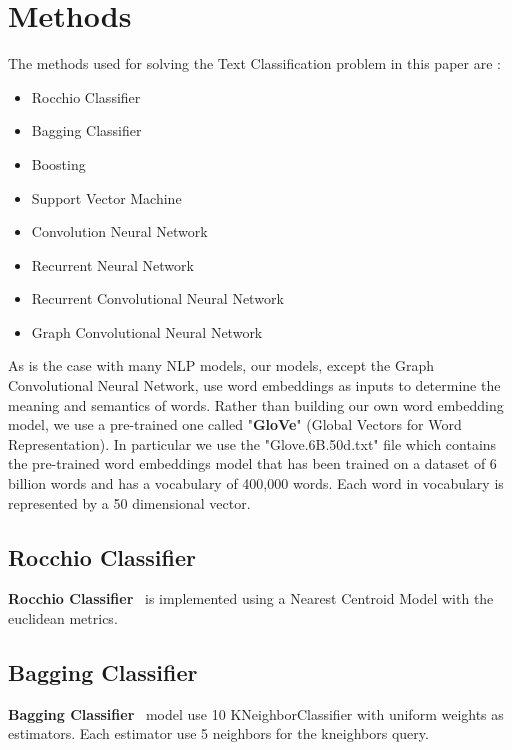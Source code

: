 \section{Methods}
The methods used for solving the Text Classification problem in this paper are :
\begin{itemize}
    \item Rocchio Classifier~\cite{paper-text-classification-algorithms}
    \item Bagging Classifier~\cite{paper-text-classification-algorithms}
    \item Boosting~\cite{paper-text-classification-algorithms}
    \item Support Vector Machine~\cite{paper-text-classification-algorithms}
    \item Convolution Neural Network~\cite{paper-text-classification-algorithms}
    \item Recurrent Neural Network~\cite{paper-text-classification-algorithms}
    \item Recurrent Convolutional Neural Network~\cite{paper-text-classification-algorithms}
    \item Graph Convolutional Neural Network~\cite{paper-graph-convolution-network}
\end{itemize}

As is the case with many NLP models, our models, except the Graph Convolutional Neural Network, use word embeddings as inputs to determine the meaning and semantics of words.
Rather than building our own word embedding model, we use a pre-trained one called "\textbf{GloVe}" (Global Vectors for Word Representation). In particular we use the "Glove.6B.50d.txt" file which contains the pre-trained word embeddings model that has been trained on a dataset of 6 billion words and has a vocabulary of 400,000 words. Each word in vocabulary is represented by a 50 dimensional vector.

\subsection{Rocchio Classifier}
\textbf{Rocchio Classifier}~\cite{paper-text-classification-algorithms} is implemented using a Nearest Centroid Model with the euclidean metrics.

\subsection{Bagging Classifier}
\textbf{Bagging Classifier}~\cite{paper-text-classification-algorithms} model use 10 KNeighborClassifier with uniform weights as estimators. Each estimator use 5 neighbors for the kneighbors query.

